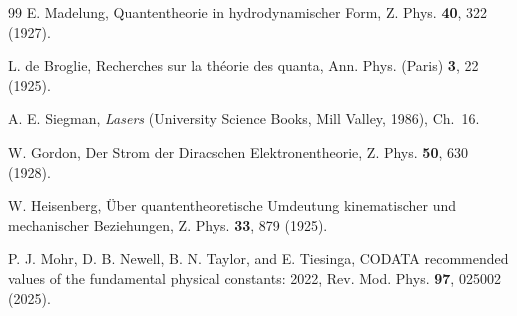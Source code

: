\documentclass[%
 reprint, amsmath,amssymb, aps, prb, ]{revtex4-2}
\numberwithin{equation}{section}
\begin{document}
\begin{thebibliography}{99}
 E. Madelung, Quantentheorie in hydrodynamischer Form, Z. Phys. \textbf{40}, 322 (1927).

 L. de Broglie, Recherches sur la th\'eorie des quanta, Ann. Phys. (Paris) \textbf{3}, 22 (1925).

 A. E. Siegman, \textit{Lasers} (University Science Books, Mill Valley, 1986), Ch.~16.

 W. Gordon, Der Strom der Diracschen Elektronentheorie, Z. Phys. \textbf{50}, 630 (1928).

 W. Heisenberg, \"Uber quantentheoretische Umdeutung kinematischer und mechanischer Beziehungen, Z. Phys. \textbf{33}, 879 (1925).

 P. J. Mohr, D. B. Newell, B. N. Taylor, and E. Tiesinga, CODATA recommended values of the fundamental physical constants: 2022, Rev. Mod. Phys. \textbf{97}, 025002 (2025).

\end{thebibliography}
\end{document}

